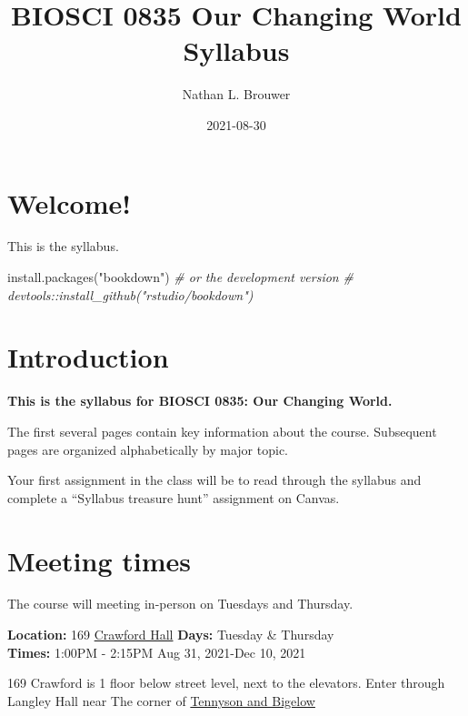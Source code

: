\documentclass[
]{book}
\title{BIOSCI 0835 Our Changing World Syllabus}
\author{Nathan L. Brouwer}
\date{2021-08-30}
\newenvironment{Shaded}{\begin{snugshade}}{\end{snugshade}}
\newcommand{\CommentTok}[1]{\textcolor[rgb]{0.56,0.35,0.01}{\textit{#1}}}
\newcommand{\FunctionTok}[1]{\textcolor[rgb]{0.00,0.00,0.00}{#1}}
\newcommand{\NormalTok}[1]{#1}
\newcommand{\StringTok}[1]{\textcolor[rgb]{0.31,0.60,0.02}{#1}}
\begin{document}
\maketitle

{
\setcounter{tocdepth}{1}
\tableofcontents
}
\hypertarget{welcome}{%
\chapter{Welcome!}\label{welcome}}

This is the syllabus.

\begin{Shaded}
\begin{Highlighting}[]
\FunctionTok{install.packages}\NormalTok{(}\StringTok{"bookdown"}\NormalTok{)}
\CommentTok{\# or the development version}
\CommentTok{\# devtools::install\_github("rstudio/bookdown")}
\end{Highlighting}
\end{Shaded}

\hypertarget{intro}{%
\chapter{Introduction}\label{intro}}

\textbf{This is the syllabus for BIOSCI 0835: Our Changing World.}

The first several pages contain key information about the course. Subsequent pages are organized alphabetically by major topic.

Your first assignment in the class will be to read through the syllabus and complete a ``Syllabus treasure hunt'' assignment on Canvas.

\hypertarget{meeting-times}{%
\chapter{Meeting times}\label{meeting-times}}

The course will meeting in-person on Tuesdays and Thursday.

\textbf{Location:} 169 \href{https://calendar.pitt.edu/crawford_hall_909\#.YSZMWdPYq3I}{Crawford Hall}
\textbf{Days:} Tuesday \& Thursday\\
\textbf{Times:} 1:00PM - 2:15PM
Aug 31, 2021-Dec 10, 2021

169 Crawford is 1 floor below street level, next to the elevators. Enter through Langley Hall near The corner of \href{https://goo.gl/maps/ay3KxznH1u4VisWo8}{Tennyson and Bigelow}
\end{document}
